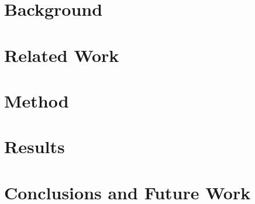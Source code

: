 \documentclass[12pt]{scrreprt}
\begin{document}
\chapter{Background}
\label{chapter_background}

\chapter{Related Work}
\label{chapter_relatedwork}

\chapter{Method}
\label{chapter_method}

\chapter{Results}
\label{chapter_results}

\chapter{Conclusions and Future Work}
\label{chapter_conclusions}


\printbibliography
\end{document}
